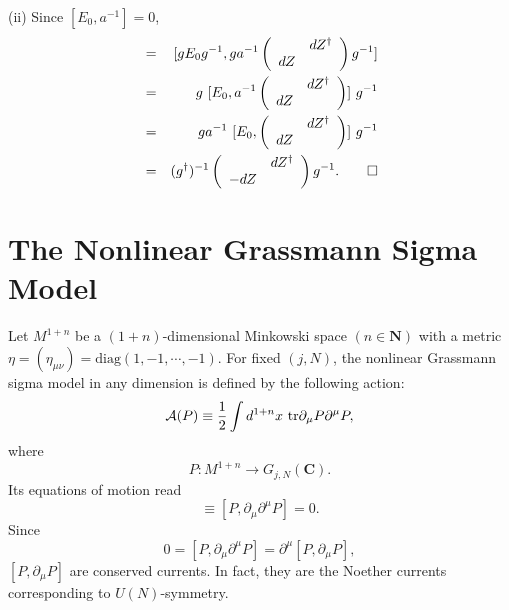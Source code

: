\documentclass[makeidx,12pt,openany]{report}
\begin{document}
(ii) Since $[E_0, a^{-1}]=0$, 
\begin{eqnarray*}
[P_0,dP_0] 
&=& [gE_0g^{-1}, g a^{-1} \left(
           \begin{array}{cc}
                 & dZ^{\dag}  \\
              dZ &    \\
            \end{array}
         \right)  g^{-1}] \\
&=& g \ [E_0, a^{-1} \left(
           \begin{array}{cc}
                 & dZ^{\dag}  \\
              dZ &    \\
            \end{array}
         \right) ] \ g^{-1} \\
&=& g a^{-1} \ [E_0, \left(
           \begin{array}{cc}
                 & dZ^{\dag}  \\
              dZ &    \\
            \end{array}
         \right) ] \ g^{-1} \\
&=& (g^{\dag})^{-1} \left(
           \begin{array}{cc}
                 & dZ^{\dag}  \\
              -dZ &    \\
            \end{array}
         \right) g^{-1}. \qed
\end{eqnarray*}

 \section{The Nonlinear Grassmann Sigma Model}
Let $M^{1+n}$ be a $(1+n)$-dimensional Minkowski space $(n \in {\mathbf N})$ with a metric $\eta = (\eta_{\mu \nu}) = \mbox{diag}(1,-1,\cdots ,-1)$. 
For fixed $(j,N)$, the nonlinear Grassmann sigma model in any dimension is defined by the following action: 
\begin{equation}
 \mbox{$\cal{A}$}(P) \equiv \frac12 \int d^{1+n} x \ 
                             \mbox{tr}\partial_{\mu}P\partial^{\mu}P,
 \label{eqn:n2-1}
\end{equation}
where
$$
 P:M^{1+n} \longrightarrow G_{j,N}({\mathbf{C}}).
$$
Its equations of motion read 
\begin{equation}
 [P, \square P] \equiv [P, \partial_{\mu}\partial^{\mu}P]=0.
 \label{eqn:n2-2}
\end{equation}
Since
\begin{equation}
 0=[P, \partial_{\mu}\partial^{\mu}P]
  =\partial^{\mu}[P, \partial_{\mu}P],
\end{equation}
$[P, \partial_{\mu}P]$ are conserved currents. In fact, they are 
the Noether currents corresponding to $U(N)$-symmetry.
\end{document}
